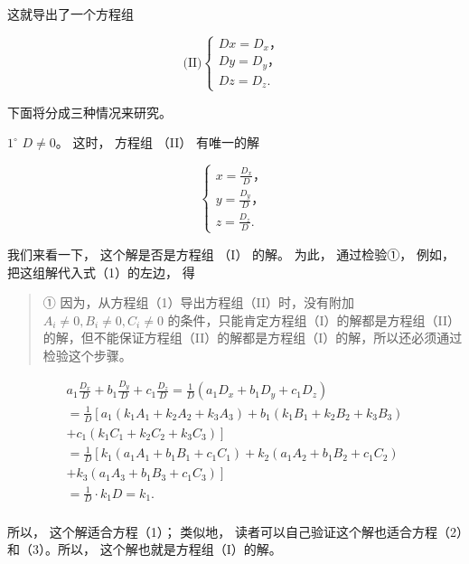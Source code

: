 这就导出了一个方程组

\[
\text {(II)} \left\{ \begin{array}{l} D x = D _ {x}\text{，} \\ D y = D _ {y}\text{，} \\ D z = D _ {z}. \end{array} \right.
\]

下面将分成三种情况来研究。

\(1^{\circ}\) \(D \neq 0\)。 这时， 方程组 （II） 有唯一的解

\[
\left\{ \begin{array}{l} x = \frac {D _ {x}}{D}\text{，} \\ y = \frac {D _ {y}}{D}\text{，} \\ z = \frac {D _ {z}}{D}. \end{array} \right.
\]

我们来看一下， 这个解是否是方程组 （I） 的解。 为此， 通过检验①， 例如，
把这组解代入式（1）的左边， 得

\begin{quote}
① 因为，从方程组（1）导出方程组（II）时，没有附加
\(A_{i} \neq 0, B_{i} \neq 0, C_{i} \neq 0\)
的条件，只能肯定方程组（I）的解都是方程组（II）的解，但不能保证方程组（II）的解都是方程组（I）的解，所以还必须通过检验这个步骤。
\end{quote}

\[
\begin{array}{l} a _ {1} \frac {D _ {x}}{D} + b _ {1} \frac {D _ {y}}{D} + c _ {1} \frac {D _ {z}}{D} = \frac {1}{D} \left(a _ {1} D _ {x} + b _ {1} D _ {y} + c _ {1} D _ {z}\right) \\ = \frac {1}{D} \left[ a _ {1} \left(k _ {1} A _ {1} + k _ {2} A _ {2} + k _ {3} A _ {3}\right) + b _ {1} \left(k _ {1} B _ {1} + k _ {2} B _ {2} + k _ {3} B _ {3}\right) \right. \\ \left. + c _ {1} \left(k _ {1} C _ {1} + k _ {2} C _ {2} + k _ {3} C _ {3}\right) \right] \\ = \frac {1}{D} \left[ k _ {1} \left(a _ {1} A _ {1} + b _ {1} B _ {1} + c _ {1} C _ {1}\right) + k _ {2} \left(a _ {1} A _ {2} + b _ {1} B _ {2} + c _ {1} C _ {2}\right) \right. \\ \left. + k _ {3} \left(a _ {1} A _ {3} + b _ {1} B _ {3} + c _ {1} C _ {3}\right) \right] \\ = \frac {1}{D} \cdot k _ {1} D = k _ {1}. \\ \end{array}
\]

所以， 这个解适合方程（1）； 类似地，
读者可以自己验证这个解也适合方程（2）和（3）。所以，
这个解也就是方程组（I）的解。

